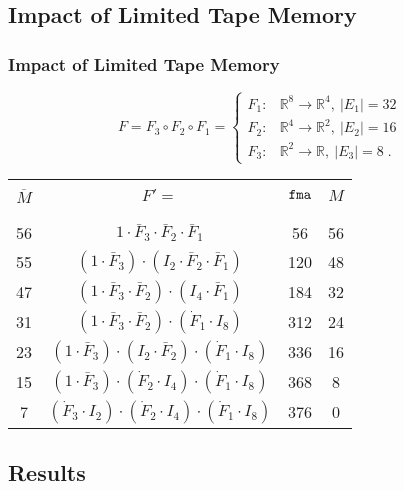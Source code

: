 \documentclass[ucs,10pt]{beamer}
\newcommand{\R}{{\mathbb{R}}}
\newcommand{\fma}{{\small {\tt fma}}}
\begin{document}
\subsection{Impact of Limited Tape Memory}

\begin{frame}
\frametitle{Impact of Limited Tape Memory}
$$F=F_3 \circ F_2 \circ F_1 =
\begin{cases}
F_1 :& \R^8 \rightarrow \R^4,~|E_1|=32  \\
F_2 :& \R^4 \rightarrow \R^2,~|E_2|=16 \\
F_3 :& \R^2 \rightarrow \R,~|E_3|=8 \; .
\end{cases}
$$
\vfill
\begin{center}
\begin{tabular}{|c|c|c|c|}
\hline
&&&\vspace{-3mm} \\
$\overline{M}$ & $F'=$ & $\fma$ & $M$ \\
&&&\vspace{-3mm} \\
\hline
&&&\vspace{-3mm} \\
56 & $1 \cdot \bar{F}_3 \cdot \bar{F}_2 \cdot \bar{F}_1$ & 56 & 56 \\
55 & $(1 \cdot \bar{F}_3) \cdot (I_2 \cdot \bar{F}_2 \cdot \bar{F}_1)$ & 120 & 48 \\
47 & $(1 \cdot \bar{F}_3 \cdot \bar{F}_2) \cdot  (I_4 \cdot \bar{F}_1)$ & 184 & 32 \\
31 & $(1 \cdot \bar{F}_3 \cdot \bar{F}_2) \cdot  (\dot{F}_1 \cdot I_8)$ & 312 & 24 \\
23 & $(1 \cdot \bar{F}_3) \cdot (I_2 \cdot \bar{F}_2) \cdot  (\dot{F}_1 \cdot I_8)$ & 336 & 16 \\
15 & $(1 \cdot \bar{F}_3) \cdot (\dot{F}_2 \cdot I_4) \cdot  (\dot{F}_1 \cdot I_8)$ & 368 & 8 \\
7 & $(\dot{F}_3 \cdot I_2) \cdot (\dot{F}_2 \cdot I_4) \cdot  (\dot{F}_1 \cdot I_8)$ & 376 & 0 \\
\hline
\end{tabular}
\end{center}
\end{frame}

\subsection{Results}
\end{document}
